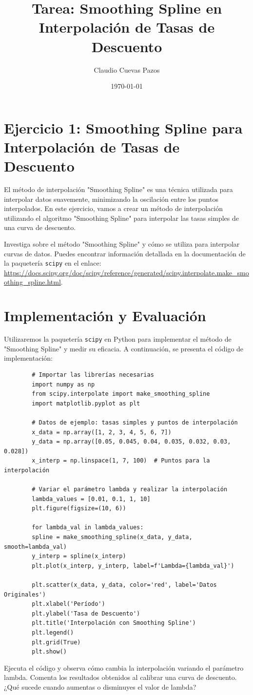 \documentclass{article}
\title{Tarea: Smoothing Spline en Interpolación de Tasas de Descuento}
\author{Claudio Cuevas Pazos}
\date{\today}
\begin{document}
	
	\maketitle
	
	\section*{Ejercicio 1: Smoothing Spline para Interpolación de Tasas de Descuento}
	
	El método de interpolación "Smoothing Spline" es una técnica utilizada para interpolar datos suavemente, minimizando la oscilación entre los puntos interpolados. En este ejercicio, vamos a crear un método de interpolación utilizando el algoritmo "Smoothing Spline" para interpolar las tasas simples de una curva de descuento.
	
	Investiga sobre el método "Smoothing Spline" y cómo se utiliza para interpolar curvas de datos. Puedes encontrar información detallada en la documentación de la paquetería \texttt{scipy} en el enlace: \url{https://docs.scipy.org/doc/scipy/reference/generated/scipy.interpolate.make\_smoothing\_spline.html}.
	
	\section*{Implementación y Evaluación}
	
	Utilizaremos la paquetería \texttt{scipy} en Python para implementar el método de "Smoothing Spline" y medir su eficacia. A continuación, se presenta el código de implementación:
	
	\begin{verbatim}
		# Importar las librerías necesarias
		import numpy as np
		from scipy.interpolate import make_smoothing_spline
		import matplotlib.pyplot as plt
		
		# Datos de ejemplo: tasas simples y puntos de interpolación
		x_data = np.array([1, 2, 3, 4, 5, 6, 7])
		y_data = np.array([0.05, 0.045, 0.04, 0.035, 0.032, 0.03, 0.028])
		x_interp = np.linspace(1, 7, 100)  # Puntos para la interpolación
		
		# Variar el parámetro lambda y realizar la interpolación
		lambda_values = [0.01, 0.1, 1, 10]
		plt.figure(figsize=(10, 6))
		
		for lambda_val in lambda_values:
		spline = make_smoothing_spline(x_data, y_data, smooth=lambda_val)
		y_interp = spline(x_interp)
		plt.plot(x_interp, y_interp, label=f'Lambda={lambda_val}')
		
		plt.scatter(x_data, y_data, color='red', label='Datos Originales')
		plt.xlabel('Período')
		plt.ylabel('Tasa de Descuento')
		plt.title('Interpolación con Smoothing Spline')
		plt.legend()
		plt.grid(True)
		plt.show()
	\end{verbatim}
	
	Ejecuta el código y observa cómo cambia la interpolación variando el parámetro lambda. Comenta los resultados obtenidos al calibrar una curva de descuento. ¿Qué sucede cuando aumentas o disminuyes el valor de lambda?
	
\end{document}

